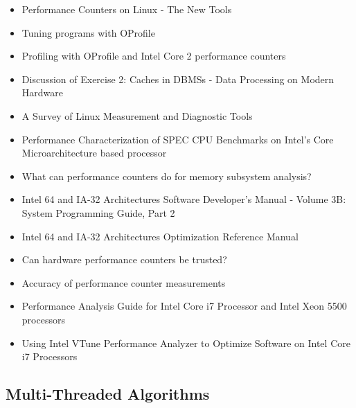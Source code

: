 \begin{itemize}
\item[\textbullet] Performance Counters on Linux - The New Tools
  \cite{Melo2009}
\item[\textbullet] Tuning programs with OProfile \cite{Cohen2004}
\item[\textbullet] Profiling with OProfile and Intel Core 2
  performance counters \cite{Nielsen2008}
\item[\textbullet] Discussion of Exercise 2: Caches in DBMSs - Data
  Processing on Modern Hardware \cite{Muller2009}
\item[\textbullet] A Survey of Linux Measurement and Diagnostic Tools
  \cite{Rowand2009}
\item[\textbullet] Performance Characterization of SPEC CPU Benchmarks
  on Intel's Core Microarchitecture based processor \cite{Bird2007}
\item[\textbullet] What can performance counters do for memory
  subsystem analysis?  \cite{Eranian2008}
\item[\textbullet] Intel \textsuperscript{\textregistered} 64 and
  IA-32 Architectures Software Developer’s Manual - Volume 3B: System
  Programming Guide, Part 2 \cite{Intel2010}
\item[\textbullet] Intel \textsuperscript{\textregistered} 64 and
  IA-32 Architectures Optimization Reference Manual \cite{Intel2009}
\item[\textbullet] Can hardware performance counters be trusted?
  \cite{Weaver2008}
\item[\textbullet] Accuracy of performance counter measurements
  \cite{Zaparanuks2008}
\item[\textbullet] Performance Analysis Guide for Intel
  \textsuperscript{\textregistered} Core
  \textsuperscript{\texttrademark} i7 Processor and Intel
  \textsuperscript{\textregistered} Xeon
  \textsuperscript{\texttrademark} 5500 processors
  \cite{Levinthal2009}
\item[\textbullet] Using Intel \textsuperscript{\textregistered} VTune
  \textsuperscript{\texttrademark} Performance Analyzer to Optimize
  Software on Intel \textsuperscript{\textregistered} Core
  \textsuperscript{\texttrademark} i7 Processors \cite{Intel2009a}
\end{itemize}

\subsection{Multi-Threaded Algorithms}

